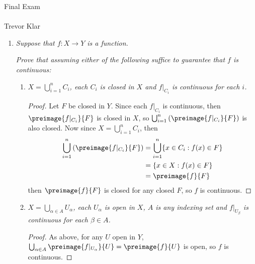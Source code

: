 \documentclass[12pt,letterpaper]{article}
\begin{document}
\pagestyle{fancy}
\begin{center}
{{\LARGE Final Exam} \\ \mbox{} \\ {\large Trevor Klar}}%
\end{center}

\begin{enumerate}
\pagebreak
\item \textit{Suppose that $f:X\to Y$ is a function. }

	\textit{Prove that assuming either of the following suffice to guarantee that $f$ is continuous:}
		\begin{enumerate}
			\item \textit{$X=\bigcup_{i=1}^n C_i$, each $C_i$ is closed in $X$ and $f|_{C_i}$ is continuous for each $i$.}
			\begin{proof}
			Let $F$ be closed in $Y$. Since each $f|_{C_i}$ is continuous, then $\preimage{f|_{C_i}}{F}$ is closed in $X$, so $\bigcup_{i=1}^n \left( \preimage{f|_{C_i}}{F}\right)$ is also closed. Now since $X=\bigcup_{i=1}^n C_i$, then 
				\begin{align*}
				\bigcup_{i=1}^n \left( \preimage{f|_{C_i}}{F}\right) &= \bigcup_{i=1}^n \{x\in C_i : f(x)\in F\}\\
				&= \{x\in X : f(x)\in F\} \\
				&= \preimage{f}{F} \\
				\end{align*}
				then $\preimage{f}{F}$ is closed for any closed $F$, so $f$ is continuous. 
			\end{proof}
			\item \textit{$X=\bigcup_{\alpha\in A} U_\alpha$, each $U_\alpha$ is open in $X$, $A$ is any indexing set and $f|_{U_\beta}$ is continuous for each $\beta\in A$. }
			\begin{proof}
			As above, for any $U$ open in $Y$, $\bigcup_{\alpha\in A} \preimage{f|_{U_\alpha}}{U}=\preimage{f}{U}$ is open, so $f$ is continuous. 
			\end{proof}
		\end{enumerate}
	

\end{enumerate}
\end{document}
